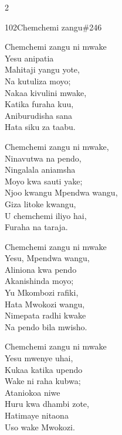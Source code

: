 \documentclass{article}
\begin{document}
\begin{multicols}{2}
\begin{hymn}{102}{Chemchemi zangu}{\#246}
\begin{stanza}
Chemchemi zangu ni mwake\\
Yesu anipatia\\
Mahitaji yangu yote,\\
Na kutuliza moyo;\\
Nakaa kivulini mwake,\\
Katika furaha kuu,\\
Aniburudisha sana\\
Hata siku za taabu.
\end{stanza}
\begin{stanza}
Chemchemi zangu ni mwake,\\
Ninavutwa na pendo,\\
Ningalala aniamsha\\
Moyo kwa sauti yake;\\
Njoo kwangu Mpendwa wangu,\\
Giza litoke kwangu,\\
U chemchemi iliyo hai,\\
Furaha na taraja.
\end{stanza}
\begin{stanza}
Chemchemi zangu ni mwake\\
Yesu, Mpendwa wangu,\\
Aliniona kwa pendo\\
Akanishinda moyo;\\
Yu Mkombozi rafiki,\\
Hata Mwokozi wangu,\\
Nimepata radhi kwake\\
Na pendo bila mwisho.
\end{stanza}
\begin{stanza}
Chemchemi zangu ni mwake\\
Yesu mwenye uhai,\\
Kukaa katika upendo\\
Wake ni raha kubwa;\\
Ataniokoa niwe\\
Huru kwa dhambi zote,\\
Hatimaye nitaona\\
Uso wake Mwokozi.
\end{stanza}
\end{hymn}


\end{multicols}
\end{document}
